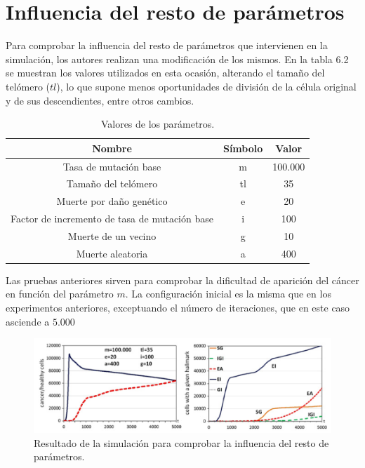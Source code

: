 \section{Influencia del resto de parámetros}

Para comprobar la influencia del resto de parámetros que intervienen en la simulación,
los autores realizan una modificación de los mismos. En la tabla 6.2 se muestran los valores
utilizados en esta ocasión, alterando el tamaño del telómero ($tl$), lo que supone
menos oportunidades de división de la célula original y de sus descendientes, entre otros
cambios.

\begin{table}[h!]
  \centering
  \caption{Valores de los parámetros.}
  \label{tab:table1}
  \begin{tabular}{ccc}
    \toprule
    Nombre & Símbolo & Valor\\
    \midrule
    Tasa de mutación base & m & 100.000\\
    Tamaño del telómero & tl & 35\\
    Muerte por daño genético & e & 20\\
    Factor de incremento de tasa de mutación base & i & 100\\
    Muerte de un vecino & g & 10\\
    Muerte aleatoria & a & 400\\
    \bottomrule
  \end{tabular}
\end{table}

Las pruebas anteriores sirven para comprobar la dificultad de aparición del cáncer en
función del parámetro $m$. La configuración inicial es la misma que en los experimentos
anteriores, exceptuando el número de iteraciones, que en este caso asciende a $5.000$

\begin{figure}[h]
\centering
\includegraphics[scale=0.8]{figures/experiments/exp4}
\caption{Resultado de la simulación para comprobar la influencia del resto de parámetros.}
\label{fig:exp4}
\end{figure}

